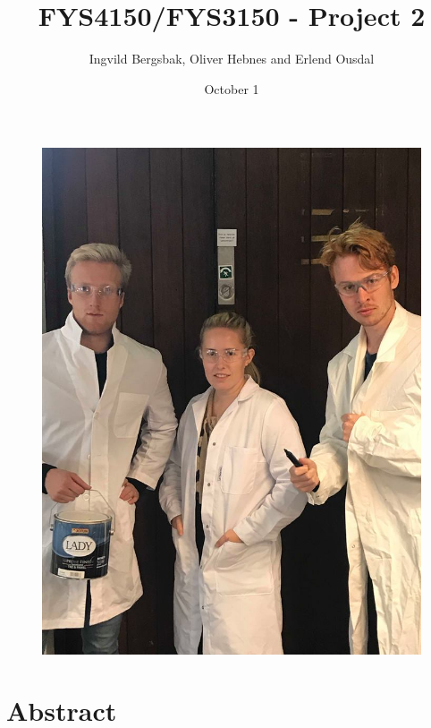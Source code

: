 \documentclass{article}
\begin{document}
\title{\textbf{FYS4150/FYS3150 - Project 2}}
\author{Ingvild Bergsbak, Oliver Hebnes and Erlend Ousdal}
\date{October 1}
\maketitle

\begin{figure}[H]
  \includegraphics[scale=0.4]{Forsiden.jpg}
  \label{}
  \centering
\end{figure}



\newpage

\section{Abstract}
\end{document}
